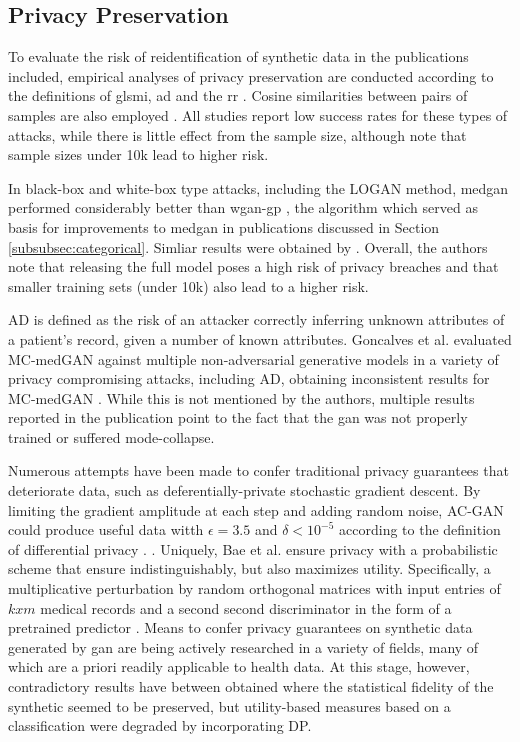 \subsection{Privacy Preservation}
To evaluate the risk of reidentification of synthetic data in the publications included, empirical analyses of privacy preservation are conducted according to the definitions of gls{mi}, \gls{ad}  \cite{Choi2017-nt,Goncalves2020,yan2020generating,chen2019ganleaks} and the \gls{rr} \cite{Zhang2020}. Cosine similarities between pairs of samples are also employed \cite{torfi2019generating}. All studies report low success rates for these types of attacks, while there is little effect from the sample size, although \citeauthor{chen2019ganleaks} note that sample sizes under 10k lead to higher risk. \par
In black-box and white-box type attacks, including the LOGAN \cite{hayes2017logan} method, \gls{medgan} performed considerably better than \gls{wgan-gp} \cite{gulrajani2017improved}, the algorithm which served as basis for improvements to \gls{medgan} in publications discussed in Section \ref{subsubsec:categorical}. Simliar results were obtained by \citeauthor{chen2019ganleaks}. Overall, the authors note that releasing the full model poses a high risk of privacy breaches and that smaller training sets (under 10k) also lead to a higher risk.\par  
AD is defined as the risk of an attacker correctly inferring unknown attributes of a patient's record, given a number of known attributes. Goncalves et al. evaluated MC-medGAN against multiple non-adversarial generative models in a variety of privacy compromising attacks, including AD, obtaining inconsistent results for MC-medGAN \cite{Goncalves2020}. While this is not mentioned by the authors, multiple results reported in the publication point to the fact that the \gls{gan} was not properly trained or suffered mode-collapse.\par
Numerous attempts have been made to confer traditional privacy guarantees that deteriorate data, such as deferentially-private stochastic gradient descent. By limiting the gradient amplitude at each step and adding random noise, AC-GAN could produce useful data witth $\epsilon=3.5$ and $\delta<10^{-5}$ according to the definition of differential privacy \cite{Beaulieu-Jones2019-ct, esteban2017real,chincheong2020generation}. \cite{BaeAnomiGAN2020}. Uniquely, Bae et al. ensure privacy with a probabilistic scheme that ensure indistinguishably, but also maximizes utility. Specifically, a multiplicative perturbation by random orthogonal matrices with input entries of $k x m$ medical records and a second second discriminator in the form of a pretrained  predictor \cite{BaeAnomiGAN2020}. Means to confer privacy guarantees on synthetic data generated by \gls{gan} are being actively researched in a variety of fields, many of which are a priori readily applicable to health data. At this stage, however, contradictory results have between obtained where the statistical fidelity of the synthetic seemed to be preserved, but utility-based measures based on a classification were degraded by incorporating DP.\par
